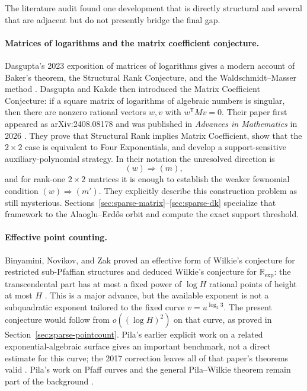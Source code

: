 \documentclass[11pt,oneside]{article}
\theoremstyle{definition}
\theoremstyle{remark}
\newcommand{\R}{\mathbb R}
\begin{document}
The literature audit found one development that is directly structural and several that are
adjacent but do not presently bridge the final gap.

\paragraph{Matrices of logarithms and the matrix coefficient conjecture.}
Dasgupta's 2023 exposition of matrices of logarithms gives a modern account of Baker's
theorem, the Structural Rank Conjecture, and the Waldschmidt--Masser method
\cite{Dasgupta2023}.  Dasgupta and Kakde then introduced the Matrix Coefficient Conjecture:
if a square matrix of logarithms of algebraic numbers is singular, then there are nonzero
rational vectors $w,v$ with $w^{\mathsf T}Mv=0$.  Their paper first appeared as
arXiv:2408.08178 and was published in \emph{Advances in Mathematics} in 2026
\cite{DasguptaKakde2026}.  They prove that Structural Rank implies Matrix Coefficient, show
that the $2\times2$ case is equivalent to Four Exponentials, and develop a support-sensitive
auxiliary-polynomial strategy.  In their notation the unresolved direction is
\[
  (w)\Longrightarrow(m),
\]
and for rank-one $2\times2$ matrices it is enough to establish the weaker fewnomial condition
$(w)\Longrightarrow(m')$.  They explicitly describe this construction problem as still
mysterious.  Sections~\ref{sec:sparse-matrix}--\ref{sec:sparse-dk} specialize that framework
to the Alaoglu--Erd\H{o}s orbit and compute the exact support threshold.

\paragraph{Effective point counting.}
Binyamini, Novikov, and Zak proved an effective form of Wilkie's conjecture for restricted
sub-Pfaffian structures and deduced Wilkie's conjecture for $\R_{\exp}$: the transcendental
part has at most a fixed power of $\log H$ rational points of height at most $H$
\cite{BinyaminiNovikovZak2024}.  This is a major advance, but the available exponent is not a
subquadratic exponent tailored to the fixed curve $v=u^{\log_2 3}$.  The present conjecture
would follow from $o((\log H)^2)$ on that curve, as proved in
Section~\ref{sec:sparse-pointcount}.  Pila's earlier explicit work on a related
exponential-algebraic surface gives an important benchmark, not a direct estimate for this
curve; the 2017 correction leaves all of that paper's theorems valid
\cite{Pila2010Surface,Pila2017Correction}.  Pila's work on Pfaff curves and the general
Pila--Wilkie theorem remain part of the background
\cite{Pila2007Pfaff,PilaWilkie2006}.
\end{document}
